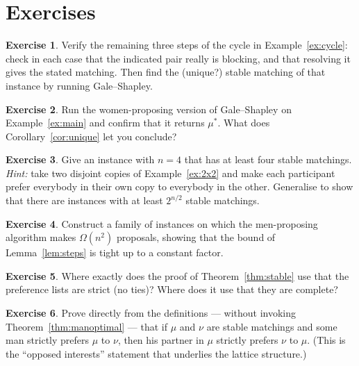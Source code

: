 \documentclass[11pt,a4paper]{article}
\theoremstyle{plain}
\theoremstyle{definition}
\newtheorem{exercise}{Exercise}
\theoremstyle{remark}
\begin{document}
\section{Exercises}

\begin{exercise}
Verify the remaining three steps of the cycle in Example~\ref{ex:cycle}: check
in each case that the indicated pair really is blocking, and that resolving it
gives the stated matching. Then find the (unique?) stable matching of that
instance by running Gale--Shapley.
\end{exercise}

\begin{exercise}
Run the women-proposing version of Gale--Shapley on Example~\ref{ex:main} and
confirm that it returns $\mu^*$. What does Corollary~\ref{cor:unique} let you
conclude?
\end{exercise}

\begin{exercise}
Give an instance with $n = 4$ that has at least four stable matchings.
\emph{Hint:} take two disjoint copies of Example~\ref{ex:2x2} and make each
participant prefer everybody in their own copy to everybody in the other.
Generalise to show that there are instances with at least $2^{n/2}$ stable
matchings.
\end{exercise}

\begin{exercise}
Construct a family of instances on which the men-proposing algorithm makes
$\Omega(n^2)$ proposals, showing that the bound of Lemma~\ref{lem:steps} is
tight up to a constant factor.
\end{exercise}

\begin{exercise}
Where exactly does the proof of Theorem~\ref{thm:stable} use that the
preference lists are strict (no ties)? Where does it use that they are
complete?
\end{exercise}

\begin{exercise}
Prove directly from the definitions --- without invoking
Theorem~\ref{thm:manoptimal} --- that if $\mu$ and $\nu$ are stable matchings
and some man strictly prefers $\mu$ to $\nu$, then his partner in $\mu$
strictly prefers $\nu$ to $\mu$. (This is the ``opposed interests'' statement
that underlies the lattice structure.)
\end{exercise}
\end{document}
